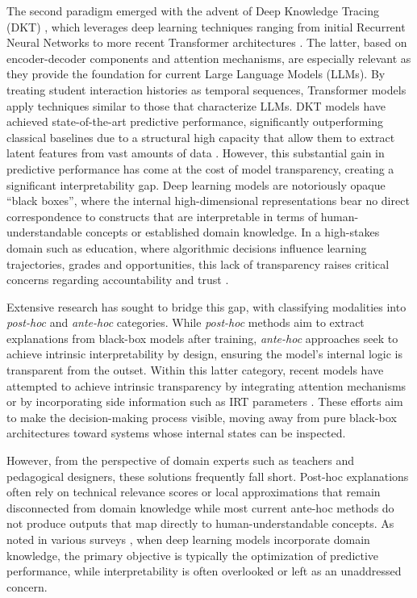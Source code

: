 \documentclass[applsci,article,submit,moreauthors,pdftex]{Definitions/mdpi}
\begin{document}
The second paradigm emerged with the advent of Deep Knowledge Tracing (DKT) \citep{piech2015deep}, which leverages deep learning techniques ranging from initial Recurrent Neural Networks to more recent Transformer architectures \citep{vaswani2017attention}. The latter, based on encoder-decoder components and attention mechanisms, are especially relevant as they provide the foundation for current Large Language Models (LLMs). By treating student interaction histories as temporal sequences, Transformer models apply techniques similar to those that characterize LLMs. DKT models have achieved state-of-the-art predictive performance, significantly outperforming classical baselines due to a structural high capacity that allow them to extract latent features from vast amounts of data \citep{abdelrahman2023knowledge}. However, this substantial gain in predictive performance has come at the cost of model transparency, creating a significant interpretability gap. Deep learning models are notoriously opaque ``black boxes'', where the internal high-dimensional representations bear no direct correspondence to constructs that are interpretable in terms of human-understandable concepts or established domain knowledge. In a high-stakes domain such as education, where algorithmic decisions influence learning trajectories, grades and opportunities, this lack of transparency raises critical concerns regarding accountability and trust \citep{Holmes2022504}.

Extensive research has sought to bridge this gap, with \citet{bai2024survey} classifying modalities into \textit{post-hoc} and \textit{ante-hoc} categories. While \textit{post-hoc} methods aim to extract explanations from black-box models after training, \textit{ante-hoc} approaches seek to achieve intrinsic interpretability by design, ensuring the model's internal logic is transparent from the outset. Within this latter category, recent models have attempted to achieve intrinsic transparency by integrating attention mechanisms \citep{Pandey2019384, ghosh2020context} or by incorporating side information such as IRT parameters \citep{yeung2019deep, su2021time, chen2023improving}. These efforts aim to make the decision-making process visible, moving away from pure black-box architectures toward systems whose internal states can be inspected.

However, from the perspective of domain experts such as teachers and pedagogical designers, these solutions frequently fall short. Post-hoc explanations often rely on technical relevance scores or local approximations that remain disconnected from domain knowledge \citep{rudin2019stop} while most current ante-hoc methods do not produce outputs that map directly to human-understandable concepts. As noted in various surveys \citep{bai2024survey, vonrueden2021informed}, when deep learning models incorporate domain knowledge, the primary objective is typically the optimization of predictive performance, while interpretability is often overlooked or left as an unaddressed concern.
\end{document}
